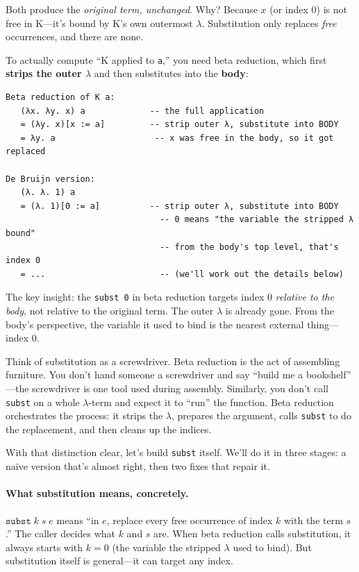 \documentclass[11pt,a4paper]{article}
\theoremstyle{definition}
\newcommand{\lam}{\lambda}
\begin{document}
Both produce the \emph{original term, unchanged}. Why? Because $x$ (or index
$0$) is not free in K---it's bound by K's own outermost $\lam$. Substitution
only replaces \emph{free} occurrences, and there are none.

To actually compute ``K applied to \texttt{a},'' you need beta reduction, which
first \textbf{strips the outer $\lam$} and then substitutes into the
\textbf{body}:

\begin{verbatim}
Beta reduction of K a:
   (λx. λy. x) a             -- the full application
   = (λy. x)[x := a]         -- strip outer λ, substitute into BODY
   = λy. a                    -- x was free in the body, so it got replaced

De Bruijn version:
   (λ. λ. 1) a
   = (λ. 1)[0 := a]          -- strip outer λ, substitute into BODY
                               -- 0 means "the variable the stripped λ bound"
                               -- from the body's top level, that's index 0
   = ...                       -- (we'll work out the details below)
\end{verbatim}

The key insight: the \texttt{subst 0} in beta reduction targets index $0$
\emph{relative to the body}, not relative to the original term. The outer
$\lam$ is already gone. From the body's perspective, the variable it used to
bind is the nearest external thing---index $0$.

\begin{intuition}
Think of substitution as a screwdriver. Beta reduction is the act of assembling
furniture. You don't hand someone a screwdriver and say ``build me a bookshelf''
---the screwdriver is one tool used during assembly. Similarly, you don't call
\texttt{subst} on a whole $\lam$-term and expect it to ``run'' the function.
Beta reduction orchestrates the process: it strips the $\lam$, prepares the
argument, calls \texttt{subst} to do the replacement, and then cleans up the
indices.
\end{intuition}

With that distinction clear, let's build \texttt{subst} itself. We'll do it in
three stages: a na\"ive version that's almost right, then two fixes that
repair it.

\paragraph{What substitution means, concretely.}
$\texttt{subst}\;k\;s\;e$ means ``in $e$, replace every free occurrence
of index $k$ with the term $s$.'' The caller decides what $k$ and $s$ are.
When beta reduction calls substitution, it always starts with $k = 0$ (the
variable the stripped $\lam$ used to bind). But substitution itself is
general---it can target any index.
\end{document}
